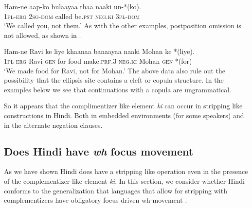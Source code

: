 \documentclass[output=paper]{langscibook}
\begin{document}
\ea \label{maex16}
    \gll Ham-ne aap-ko bulaayaa thaa naaki un-*(ko).\\
    \textsc{1pl-erg} \textsc{2sg-dom} called be.\textsc{pst} \textsc{neg.ki} \textsc{3pl-dom}\\
    \glt `We called you, not them.'
\z 
As with the other examples, postposition omission is not allowed, as shown in .

\ea \label{maex17}
    \gll Ham-ne Ravi ke liye khaanaa banaayaa naaki Mohan ke *(liye).\\
    \textsc{1pl-erg} Ravi \textsc{gen} for food make.\textsc{prf.3} \textsc{neg.ki} Mohan \textsc{gen} *(for)\\
    \glt `We made food for Ravi, not for Mohan.'
\z 
The above data also rule out the possibility that the ellipsis site contains a cleft or copula structure. In the examples below we see that continuations with a copula are ungrammatical.

\ea 
    \z 
\z 
So it appears that the complimentizer like element \emph{ki} can occur in stripping like constructions in Hindi. Both in embedded environments (for some speakers) and in the alternate negation clauses.

\subsection{Does Hindi have \emph{wh} focus movement}
As we have shown Hindi does have a stripping like operation even in the presence of the complementizer like element \emph{ki}. In this section, we consider whether Hindi conforms to the generalization that languages that allow for stripping with complementizers have obligatory focus driven wh-movement \citep{craenenbroeck13}. 
\end{document}

